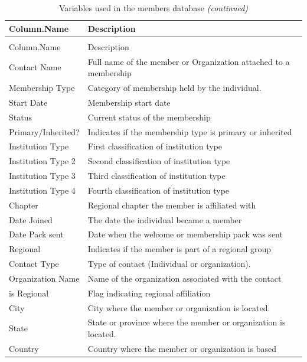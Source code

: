 \documentclass[11pt,a4paper,]{article}
\begin{document}
\begin{longtable}[t]{l>{\raggedright\arraybackslash}p{10cm}}
\caption{\label{tab:table-2}Variables used in the members database}\\
\toprule
Column.Name & Description\\
\midrule
\endfirsthead
\caption[]{\label{tab:table-2}Variables used in the members database \textit{(continued)}}\\
\toprule
Column.Name & Description\\
\midrule
\endhead

\endfoot
\bottomrule
\endlastfoot
Contact Name & Full name of the member or Organization attached to a membership\\
Membership Type & Category of membership held by the individual.\\
Start Date & Membership start date\\
Status & Current status of the membership\\
Primary/Inherited? & Indicates if the membership type is primary or inherited\\
\addlinespace
Institution Type & First classification of institution type\\
Institution Type 2 & Second classification of institution type\\
Institution Type 3 & Third classification of institution type\\
Institution Type 4 & Fourth classification of institution type\\
Chapter & Regional chapter the member is affiliated with\\
\addlinespace
Date Joined & The date the individual became a member\\
Date Pack sent & Date when the welcome or membership pack was sent\\
Regional & Indicates if the member is part of a regional group\\
Contact Type & Type of contact (Individual or organization).\\
Organization Name & Name of the organization associated with the contact\\
\addlinespace
is Regional & Flag indicating regional affiliation\\
City & City where the member or organization is located.\\
State & State or province where the member or organization is located.\\
Country & Country where the member or organization is based\\

\end{longtable}
\end{document}
